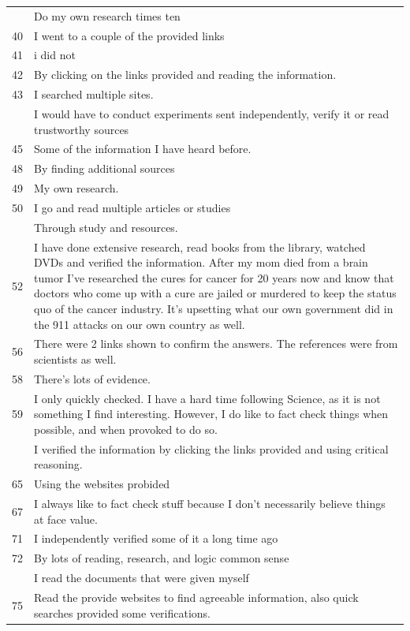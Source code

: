 \documentclass[
  doc,floatsintext]{apa6}
\begin{document}
\begin{longtable}[t]{>{}r>{\raggedright\arraybackslash}p{30em}}
\addlinespace
38 & Do my own research times ten\\
40 & I went to a couple of the provided links\\
41 & i did not\\
42 & By clicking on the links provided and reading the information.\\
43 & I searched multiple sites.\\
\addlinespace
44 & I would have to conduct experiments sent independently, verify it or read trustworthy sources\\
45 & Some of the information I have heard before.\\
48 & By finding additional sources\\
49 & My own research.\\
50 & I go and read multiple articles or studies\\
\addlinespace
51 & Through study and resources.\\
52 & I have done extensive research, read books from the library, watched DVDs and verified the information. After my mom died from a brain tumor I've researched the cures for cancer for 20 years now and know that doctors who come up with a cure are jailed or murdered to keep the status quo of the cancer industry. It's upsetting what our own government did in the 911 attacks on our own country as well.\\
56 & There were 2 links shown to confirm the answers.  The references were from scientists as well.\\
58 & There's lots of evidence.\\
59 & I only quickly checked. I have a hard time following Science, as it is not something I find interesting. However, I do like to fact check things when possible, and when provoked to do so.\\
\addlinespace
60 & I verified the information by clicking the links provided and using critical reasoning.\\
65 & Using the websites probided\\
67 & I always like to fact check stuff because I don't necessarily believe things at face value.\\
71 & I independently verified some of it a long time ago\\
72 & By lots of reading, research, and logic common sense\\
\addlinespace
74 & I read the documents that were given myself\\
75 & Read the provide websites to find agreeable information, also quick searches provided some verifications.\\

\end{longtable}
\end{document}

